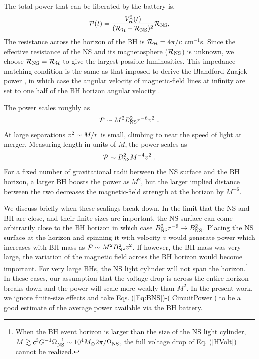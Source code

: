 The total power that can be liberated by the battery is,
\begin{align}
\label{CircuitPower}
\mathcal{P}(t) = \frac{ V^2_{\mathcal{H}}(t) }{( \mathcal{R}_{\mathcal{H}} +
  \mathcal{R}_{\rm NS} )^2 } \mathcal{R}_{\rm NS} ,
\end{align}
The resistance across the horizon of the BH is
$\mathcal{R}_{\mathcal{H}}=4\pi/c$ cm$^{-1}$s.  Since the effective
resistance of the NS and its magnetosphere ($\mathcal{R}_{\rm NS}$) is
unknown, we choose $\mathcal{R}_{\rm NS} = \mathcal{R}_{\mathcal{H}}$ to give the
largest possible luminosities. This impedance matching condition is
the same as that imposed to derive the Blandford-Znajek power
\citep{BZ:1977}, in which case the angular velocity of magnetic-field
lines at infinity are set to one half of the BH horizon angular
velocity \citep{MPBook, Penna:ImpMatch2015}.


The power scales roughly as
\begin{equation}
\mathcal{P} \sim M^2 B_{\rm NS}^2 r^{-6} v^{2} \ .
\end{equation}
At large separations $v^2 \sim M/r$ is small, climbing to near the
speed of light at merger.  Measuring length in units of $M$, the power
scales as
\begin{equation}
\mathcal{P} \sim B_{\rm NS}^2 M^{-4} v^{2} \ .
\end{equation}
For a fixed number of gravitational radii between the NS surface and
the BH horizon, a larger BH boosts the power as $M^2$, but the larger
implied distance between the two decreases the magnetic-field strength
at the horizon by $M^{-6}$.

We discuss briefly when these scalings break down. In the limit that
the NS and BH are close, and their finite sizes are important, the NS
surface can come arbitrarily close to the BH horizon in which case
$B_{\rm NS}^2 r^{-6} \rightarrow B_{\rm NS}^2$. Placing the NS
surface at the horizon and spinning it with velocity $v$ would
generate power which increases with BH mass as $\mathcal{P} \sim M^2 B_{\rm
  NS}^2 v^{2}$. If however, the BH mass was very large, the variation
of the magnetic field across the BH horizon would become
important. For very large BHs, the NS light cylinder will not span the horizon.\footnote{When the BH event horizon is larger than the size of the NS light cylinder, $M \gtrsim c^3 G^{-1} \Omega^{-1}_{\rm
  NS} \sim 10^4 M_{\odot} 2 \pi/\Omega_{\rm NS}$, the full voltage drop of Eq. (\ref{HVolt}) cannot be realized.}
%  
In these cases, our assumption that the voltage drop is across the entire horizon breaks down and the
power will scale more weakly than $M^2$. In the present work, we
ignore finite-size effects and take
Eqs. (\ref{Eq:BNS})-(\ref{CircuitPower}) to be a good estimate of the
average power available via the BH battery.


